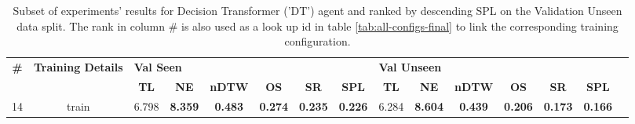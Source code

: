 \begin{table}
\centering
\caption{\label{tab:dt_spatial_features}Subset of experiments' results for Decision Transformer ('DT') agent and ranked by descending SPL on the Validation Unseen data split. The rank in column \# is also used as a look up id in table \ref{tab:all-configs-final} to link the corresponding training configuration.}
\begin{tabular}{@{\hskip3pt}c@{\hskip3pt}c@{\hskip3pt}c@{\hskip3pt}c@{\hskip3pt}c@{\hskip3pt}c@{\hskip3pt}c@{\hskip3pt}c@{\hskip3pt}c@{\hskip3pt}c@{\hskip3pt}c@{\hskip3pt}c@{\hskip3pt}c@{\hskip3pt}c@{\hskip3pt}c}
\toprule
\textbf{\#} & \textbf{Training Details} & \multicolumn{6}{l}{\textbf{Val Seen}} & \multicolumn{6}{l}{\textbf{Val Unseen}} \\
 \textbf{~} &                \textbf{~} &       \textbf{TL} &     \textbf{NE} &   \textbf{nDTW} &     \textbf{OS} &     \textbf{SR} &    \textbf{SPL} &         \textbf{TL} &     \textbf{NE} &   \textbf{nDTW} &     \textbf{OS} &     \textbf{SR} &    \textbf{SPL} \\
\midrule
         14 &                     train &             6.798 &  \textbf{8.359} &  \textbf{0.483} &  \textbf{0.274} &  \textbf{0.235} &  \textbf{0.226} &               6.284 &  \textbf{8.604} &  \textbf{0.439} &  \textbf{0.206} &  \textbf{0.173} &  \textbf{0.166} \\
\bottomrule
\end{tabular}
\end{table}
